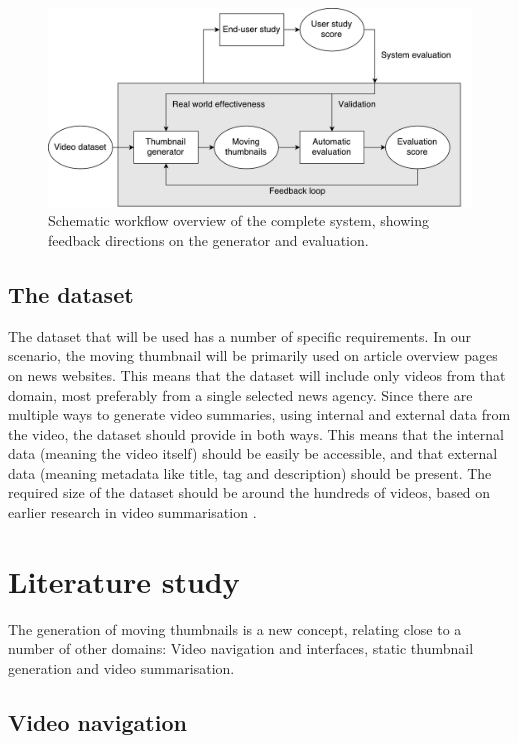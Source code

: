 \documentclass{../resources/acm_proc_article-sp}
\begin{document}
\begin{figure}[h]
  \label{fig:workflow}
  \includegraphics[width=\linewidth]{images/thesis-system.pdf}
  \caption{Schematic workflow overview of the complete system, showing feedback directions on the generator and evaluation.}
\end{figure}

\subsection{The dataset}

The dataset that will be used has a number of specific requirements. In our scenario, the moving thumbnail will be primarily used on article overview pages on news websites. This means that the dataset will include only videos from that domain, most preferably from a single selected news agency. Since there are multiple ways to generate video summaries, using internal and external data from the video, the dataset should provide in both ways. This means that the internal data (meaning the video itself) should be easily be accessible, and that external data (meaning metadata like title, tag and description) should be present. The required size of the dataset should be around the hundreds of videos, based on earlier research in video summarisation \cite{Almeida:2012be,Christel:2004in,Money:2008fn}.

\section{Literature study}

The generation of moving thumbnails is a new concept, relating close to a number of other domains: Video navigation and interfaces, static thumbnail generation and video summarisation.

\subsection{Video navigation}
\end{document}
